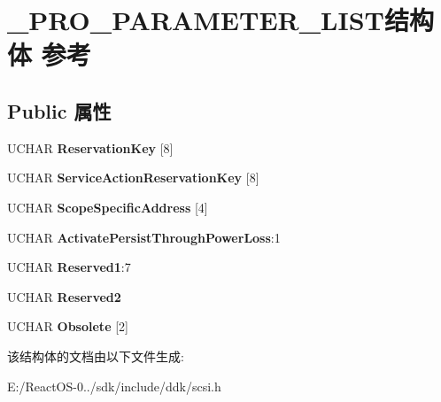 \hypertarget{struct___p_r_o___p_a_r_a_m_e_t_e_r___l_i_s_t}{}\section{\+\_\+\+P\+R\+O\+\_\+\+P\+A\+R\+A\+M\+E\+T\+E\+R\+\_\+\+L\+I\+S\+T结构体 参考}
\label{struct___p_r_o___p_a_r_a_m_e_t_e_r___l_i_s_t}
\subsection*{Public 属性}
\begin{DoxyCompactItemize}
\item 
\mbox{\label{struct___p_r_o___p_a_r_a_m_e_t_e_r___l_i_s_t_a3fd55d63d444e438570ba149a2f31388}} 
U\+C\+H\+AR {\bfseries Reservation\+Key} \mbox{[}8\mbox{]}
\item 
\mbox{\label{struct___p_r_o___p_a_r_a_m_e_t_e_r___l_i_s_t_aa41647ece72046eb37235293de7e2221}} 
U\+C\+H\+AR {\bfseries Service\+Action\+Reservation\+Key} \mbox{[}8\mbox{]}
\item 
\mbox{\label{struct___p_r_o___p_a_r_a_m_e_t_e_r___l_i_s_t_aad131c4256af406194fea4a1121276af}} 
U\+C\+H\+AR {\bfseries Scope\+Specific\+Address} \mbox{[}4\mbox{]}
\item 
\mbox{\label{struct___p_r_o___p_a_r_a_m_e_t_e_r___l_i_s_t_a889e5d5e5e7b8870f0e96af48ebdd6ff}} 
U\+C\+H\+AR {\bfseries Activate\+Persist\+Through\+Power\+Loss}\+:1
\item 
\mbox{\label{struct___p_r_o___p_a_r_a_m_e_t_e_r___l_i_s_t_a2f46268c07ee5f50ad6a5c63d64127e6}} 
U\+C\+H\+AR {\bfseries Reserved1}\+:7
\item 
\mbox{\label{struct___p_r_o___p_a_r_a_m_e_t_e_r___l_i_s_t_a661c24fc7d6a8b96b7fe1b43e05ca179}} 
U\+C\+H\+AR {\bfseries Reserved2}
\item 
\mbox{\label{struct___p_r_o___p_a_r_a_m_e_t_e_r___l_i_s_t_a9bcad82428d78d0b040bd29ad746f2ee}} 
U\+C\+H\+AR {\bfseries Obsolete} \mbox{[}2\mbox{]}
\end{DoxyCompactItemize}


该结构体的文档由以下文件生成\+:\begin{DoxyCompactItemize}
\item 
E\+:/\+React\+O\+S-\/0../sdk/include/ddk/scsi.\+h\end{DoxyCompactItemize}
